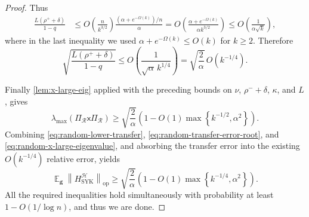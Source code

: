 \documentclass[10pt,a4paper]{amsart}
\DeclareMathOperator*{\E}{\mathbb{E}}
\newcommand{\cH}{\mathcal H}
\newcommand{\cR}{\mathcal R}
\newcommand{\sfx}{\mathsf x}
\renewcommand{\geq}{\geqslant}
\renewcommand{\leq}{\leqslant}
\begin{document}
\begin{proof}
Thus
\begin{align*}
\frac{L(\rho^++\delta)}{1-q}
&\leq
O\!\left(\frac{n}{k^{3/2}}\right)
\frac{(\alpha+e^{-\Omega(k)})/n}{\alpha}
 =
O\!\left(
\frac{\alpha+e^{-\Omega(k)}}{\alpha k^{3/2}}
\right)
\leq
O\!\left(\frac1{\alpha\sqrt{k}}\right),
\end{align*}
where in the last inequality we used
$\alpha+e^{-\Omega(k)}\leq O(k)$ for $k\geq2$. Therefore
\begin{equation}
\label{eq:random-transfer-error-root}
\sqrt{\frac{L(\rho^++\delta)}{1-q}}\leq O\!\left(\frac1{\sqrt{\alpha}\,k^{1/4}}\right) = \sqrt{\frac2\alpha}\,O\!\left(k^{-1/4}\right).
\end{equation}

Finally \cref{lem:x-large-eig} applied with the preceding bounds on $\nu$, $\rho^-+\delta$, $\kappa$, and $L$, gives
\begin{equation}
\label{eq:random-x-large-eigenvalue}
\lambda_{\max}\!\left(\Pi_\cR\sfx\Pi_\cR\right)\geq\sqrt{\frac2\alpha}\left(1-O(1)\max\left\{k^{-1/2},\alpha^2\right\}\right).
\end{equation}
Combining
\eqref{eq:random-lower-transfer},
\eqref{eq:random-transfer-error-root}, and
\eqref{eq:random-x-large-eigenvalue}, and absorbing the transfer error into
the existing $O(k^{-1/4})$ relative error, yields
\[\E_{\bm g}\left\|H^\cH_{\operatorname{SYK}}\right\|_{\operatorname{op}}\geq\sqrt{\frac2\alpha}\left(1-O(1)\max\left\{k^{-1/4},\alpha^2\right\}\right).\]
All the required inequalities hold simultaneously with probability
at least $1-O(1/\log n)$, and thus we are done.
\end{proof}
\end{document}
